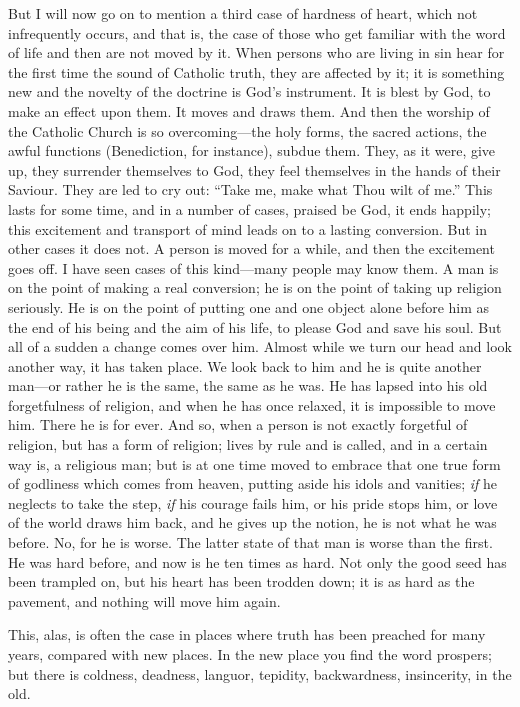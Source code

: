 But I will now go on to mention a third case of
hardness of heart, which not infrequently occurs, and that is, the
case of those who get familiar with the word of life and then are not
moved by it. When persons who are living in sin hear for the first
time the sound of Catholic truth, they are affected by it; it is
something new and the novelty of the doctrine is God's instrument. It
is blest by God, to make an effect upon them. It moves and draws them.
And then the worship of the Catholic Church is so overcoming—the
holy forms, the sacred actions, the awful functions (Benediction, for
instance), subdue them. They, as it were, give up, they surrender
themselves to God, they feel themselves in the hands of their Saviour.
They are led to cry out: ``Take me, make what Thou wilt of me.''
This lasts for some time, and in a number of cases, praised be God, it
ends happily; this excitement and transport of mind leads on to a
lasting conversion. But in other cases it does not. A person is
moved for a while, and then the excitement goes off. I have seen cases
of this kind—many people may know them. A man is on the point of
making a real conversion; he is on the point of taking up religion
seriously. He is on the point of putting one and one object alone
before him as the end of his being and the aim of his life, to please
God and save his soul. But all of a sudden a change comes over him.
Almost while we turn our head and look another way, it has taken
place. We look back to him and he is quite another man—or rather he
is the same, the same as he was. He has lapsed into his old
forgetfulness of religion, and when he has once relaxed, it is
impossible to move him. There he is for ever. And so, when a person is
not exactly forgetful of religion, but has a form of religion; lives
by rule and is called, and in a certain way is, a religious man; but
is at one time moved to embrace that one true form of godliness which
comes from heaven, putting aside his idols and vanities; \emph{if} he
neglects to take the step, \emph{if} his courage fails him, or his
pride stops him, or love of the world draws him back, and he gives up
the notion, he is not what he was before. No, for he is worse. The
latter state of that man is worse than the first. He was hard before,
and now is he ten times as hard. Not only the good seed has been
trampled on, but his heart has been trodden down; it is as hard
as the pavement, and nothing will move him again.

This, alas, is often the case in places where
truth has been preached for many years, compared with new places. In
the new place you find the word prospers; but there is coldness,
deadness, languor, tepidity, backwardness, insincerity, in the old.

